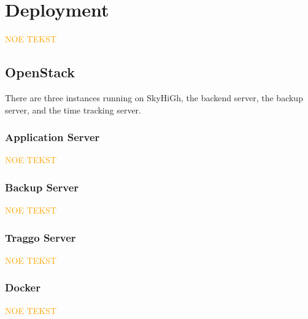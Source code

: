 \chapter{Deployment}

\textcolor{orange}{NOE TEKST}

\section{OpenStack}

There are three instances running on SkyHiGh, the backend server, the backup server, and the time tracking server. 

\subsection{Application Server}

\textcolor{orange}{NOE TEKST}

\subsection{Backup Server}

\textcolor{orange}{NOE TEKST}

\subsection{Traggo Server}

\textcolor{orange}{NOE TEKST}


\subsection{Docker}

\textcolor{orange}{NOE TEKST}
